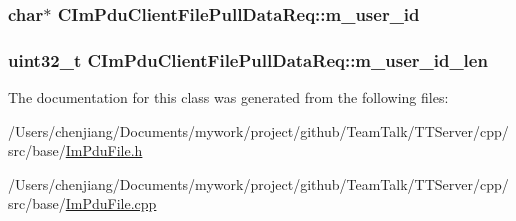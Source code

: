 \subsubsection[{m\+\_\+user\+\_\+id}]{\setlength{\rightskip}{0pt plus 5cm}char$\ast$ C\+Im\+Pdu\+Client\+File\+Pull\+Data\+Req\+::m\+\_\+user\+\_\+id\hspace{0.3cm}{\ttfamily [private]}}\label{class_c_im_pdu_client_file_pull_data_req_a4be523f46820cb8829cbb8a918b564d8}
\hypertarget{class_c_im_pdu_client_file_pull_data_req_aac19e55c0dcf7d1daa0fd8afb26dfd4e}{}
\subsubsection[{m\+\_\+user\+\_\+id\+\_\+len}]{\setlength{\rightskip}{0pt plus 5cm}uint32\+\_\+t C\+Im\+Pdu\+Client\+File\+Pull\+Data\+Req\+::m\+\_\+user\+\_\+id\+\_\+len\hspace{0.3cm}{\ttfamily [private]}}\label{class_c_im_pdu_client_file_pull_data_req_aac19e55c0dcf7d1daa0fd8afb26dfd4e}


The documentation for this class was generated from the following files\+:\begin{DoxyCompactItemize}
\item 
/\+Users/chenjiang/\+Documents/mywork/project/github/\+Team\+Talk/\+T\+T\+Server/cpp/src/base/\hyperlink{_im_pdu_file_8h}{Im\+Pdu\+File.\+h}\item 
/\+Users/chenjiang/\+Documents/mywork/project/github/\+Team\+Talk/\+T\+T\+Server/cpp/src/base/\hyperlink{_im_pdu_file_8cpp}{Im\+Pdu\+File.\+cpp}\end{DoxyCompactItemize}
